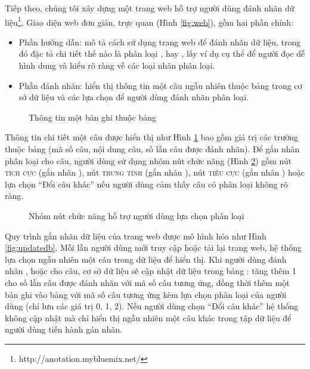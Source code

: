 Tiếp theo, chúng tôi xây dựng một trang web hỗ trợ người dùng đánh nhãn dữ liệu\footnote{http://anotation.mybluemix.net/}. Giao diện web đơn giản, trực quan (Hình \ref{fig:web}), gồm hai phần chính:
\begin{itemize}
\item Phần hướng dẫn: mô tả cách sử dụng trang web để đánh nhãn dữ liệu, trong đó đặc tả chi tiết thế nào là phân loại \tichcuc, \tieucuc hay \trungtinh, lấy ví dụ cụ thể để người đọc dễ hình dung và hiểu rõ ràng về các loại nhãn phân loại.
\item Phần đánh nhãn: hiển thị thông tin một câu ngẫu nhiên thuộc bảng  trong cơ sở dữ liệu và các lựa chọn để người dùng đánh nhãn phân loại. 
\end{itemize}

\begin{figure}[h]
\centering
{}
\caption{Thông tin một bản ghi thuộc bảng }
\label{fig:websen}
\end{figure}

Thông tin chi tiết một câu được hiển thị như Hình \ref{fig:websen} bao gồm giá trị các trường thuộc bảng  (mã số câu, nội dung câu, số lần câu được đánh nhãn). Để gắn nhãn phân loại cho câu, người dùng sử dụng nhóm nút chức năng (Hình \ref{fig:webbtn}) gồm nút \textsc{tích cực} (gắn nhãn \tichcuc), nút \textsc{trung tính} (gắn nhãn \trungtinh), nút \textsc{tiêu cực} (gắn nhãn \tieucuc) hoặc lựa chọn ``Đổi câu khác'' nếu người dùng cảm thấy câu có phân loại không rõ ràng.

\begin{figure}[h]
\centering
{}
\caption{Nhóm nút chức năng hỗ trợ người dùng lựa chọn phân loại}
\label{fig:webbtn}
\end{figure}

Quy trình gắn nhãn dữ liệu của trang web được mô hình hóa như Hình \ref{fig:updatedb}. Mỗi lần người dùng mới truy cập hoặc tải lại trang web, hệ thống lựa chọn ngẫu nhiên một câu trong dữ liệu để hiển thị. Khi người dùng đánh nhãn \tichcuc, \tieucuc hoặc \trungtinh cho câu, cơ sở dữ liệu sẽ cập nhật dữ liệu trong bảng : tăng thêm 1 cho số lần câu được đánh nhãn với mã số câu tương ứng, đồng thời thêm một bản ghi vào bảng  với mã số câu tương ứng kèm lựa chọn phân loại của người dùng (chỉ lưu các giá trị 0, 1, 2). Nếu người dùng chọn ``Đổi câu khác'' hệ thống không cập nhật mà chỉ hiển thị ngẫu nhiên một câu khác trong tập dữ liệu để người dùng tiến hành gán nhãn.

